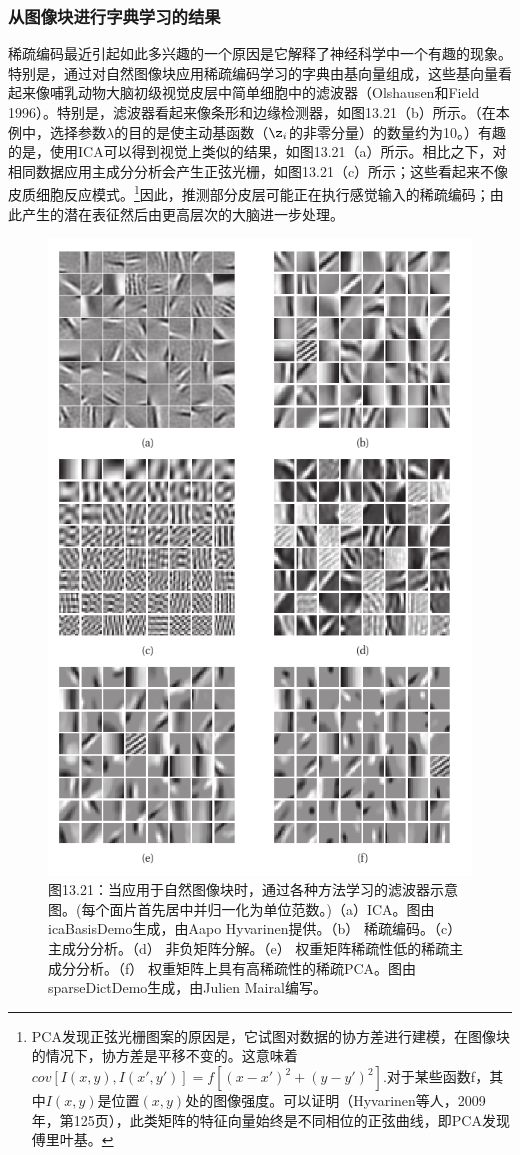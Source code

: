\documentclass[a4paper]{article}
\begin{document}
\subsubsection{从图像块进行字典学习的结果}
稀疏编码最近引起如此多兴趣的一个原因是它解释了神经科学中一个有趣的现象。特别是，通过对自然图像块应用稀疏编码学习的字典由基向量组成，这些基向量看起来像哺乳动物大脑初级视觉皮层中简单细胞中的滤波器（Olshausen和Field 1996）。特别是，滤波器看起来像条形和边缘检测器，如图13.21（b）所示。（在本例中，选择参数$\lambda$的目的是使主动基函数（$\z_i$的非零分量）的数量约为10。）有趣的是，使用ICA可以得到视觉上类似的结果，如图13.21（a）所示。相比之下，对相同数据应用主成分分析会产生正弦光栅，如图13.21（c）所示；这些看起来不像皮质细胞反应模式。\footnote{PCA发现正弦光栅图案的原因是，它试图对数据的协方差进行建模，在图像块的情况下，协方差是平移不变的。这意味着$cov[I(x,y),I(x',y')]=f[(x-x')^2+(y-y')^2]$.对于某些函数f，其中$I(x,y)$是位置$(x,y)$处的图像强度。可以证明（Hyvarinen等人，2009年，第125页），此类矩阵的特征向量始终是不同相位的正弦曲线，即PCA发现傅里叶基。}因此，推测部分皮层可能正在执行感觉输入的稀疏编码；由此产生的潜在表征然后由更高层次的大脑进一步处理。
\begin{figure}[h]
	\centering
	\includegraphics[width=0.7\linewidth]{fig13/figure21}
	\caption*{图13.21：当应用于自然图像块时，通过各种方法学习的滤波器示意图。(每个面片首先居中并归一化为单位范数。)（a）ICA。图由icaBasisDemo生成，由Aapo Hyvarinen提供。（b） 稀疏编码。（c） 主成分分析。（d） 非负矩阵分解。（e） 权重矩阵稀疏性低的稀疏主成分分析。（f） 权重矩阵上具有高稀疏性的稀疏PCA。图由sparseDictDemo生成，由Julien Mairal编写。}
\end{figure}
\end{document}
